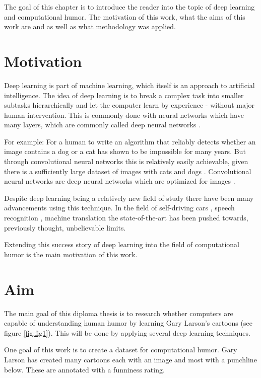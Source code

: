 \documentclass[draft,final,oneside]{vutinfth} %
\begin{document}
The goal of this chapter is to introduce the reader into the topic of deep learning and computational humor. The motivation of this work, what the aims of this work are and as well as what methodology was applied.

\section{Motivation}

Deep learning is part of machine learning, which itself is an approach to artificial intelligence. The idea of deep learning	is to break a complex task into smaller subtasks hierarchically and let the computer learn by experience - without major human intervention. This is commonly done with neural networks which have many layers, which are commonly called deep neural networks \cite{Goodfellow-et-al-2016}.

For example: For a human to write an algorithm that reliably detects whether an image contains a dog or a cat has shown to be impossible for many years. But through convolutional neural networks this is relatively easily achievable, given there is a sufficiently large dataset of images with cats and dogs \cite{dogsvscats}. Convolutional neural networks are deep neural networks which are optimized for images \cite{cnnimg}.

Despite deep learning being a relatively new field of study there have been many advancements using this technique. In the field of self-driving cars \cite{selfdriving}, speech recognition \cite{speech}, machine translation \cite{nmt} the state-of-the-art has been pushed towards, previously thought, unbelievable limits.

Extending this success story of deep learning into the field of computational humor is the main motivation of this work.

\section{Aim} \label{aim}
The main goal of this diploma thesis is to research whether computers are capable of understanding human humor by learning Gary Larson's cartoons (see figure \ref{fig:fig1}). This will be done by applying several deep learning techniques.

One goal of this work is to create a dataset for computational humor. Gary Larson has created many cartoons each with an image and most with a punchline below. These are annotated with a funniness rating.
\end{document}
